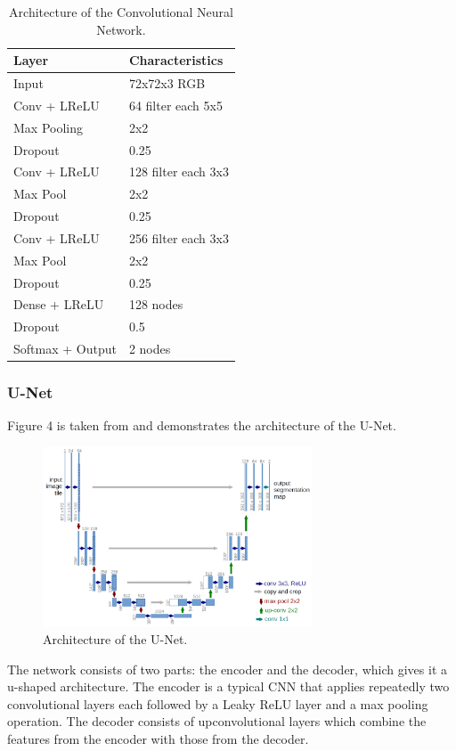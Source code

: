 \documentclass[10pt,conference,compsocconf]{IEEEtran}
\begin{document}
\begin{table}[htbp]
	\centering
	\begin{tabular}[c]{|l||l|}
		\hline
		\textbf{Layer}&\textbf{Characteristics}\\
		\hline
		Input&72x72x3 RGB\\
		Conv + LReLU &64 filter each 5x5\\
		Max Pooling&2x2\\		
		Dropout&0.25\\
		\hline
		Conv + LReLU &128 filter each 3x3\\
		Max Pool&2x2\\		
		Dropout&0.25\\
		\hline
		Conv + LReLU &256 filter each 3x3\\
		Max Pool&2x2\\		
		Dropout&0.25\\
		\hline
		Dense + LReLU &128 nodes\\
		Dropout&0.5\\		
		Softmax + Output&2 nodes\\
		\hline
	\end{tabular}
	\caption{Architecture of the Convolutional Neural Network.}
	\label{tab:cnn_architecture}
\end{table}


\subsubsection{U-Net}

Figure 4 is taken from \cite{unet} and demonstrates the architecture of the U-Net. 
\begin{figure}[htbp]
	\centering
	\includegraphics[width=8cm]{images/unet.png}
	\caption{Architecture of the U-Net.}
	\label{fig:unet}
\end{figure}

The network consists of two parts: the encoder and the decoder, which gives it a u-shaped architecture. The encoder is a typical CNN that applies repeatedly two convolutional layers each followed by a Leaky ReLU layer and a max pooling operation.
The decoder consists of upconvolutional layers which combine the features from the encoder with those from the decoder.
\end{document}
